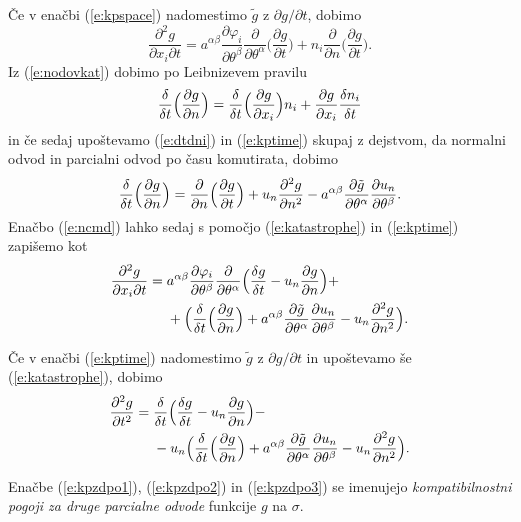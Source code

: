 Če v enačbi (\ref{e:kpspace}) nadomestimo $\tilde{g}$ z $\partial g/\partial t$, dobimo
\begin{equation} \label{e:ncmd}
	\frac{\partial^2 g}{\partial x_i\partial t}=
	a^{\alpha\beta}\frac{\partial\varphi_i}{\partial\theta^{\beta}}
	\frac{\partial}{\partial\theta^{\alpha}}\Big(\frac{\partial g}{\partial t}\Big)+
	n_i\frac{\partial}{\partial n}\Big(\frac{\partial g}{\partial t}\Big).
\end{equation}
Iz (\ref{e:nodovkat}) dobimo po Leibnizevem pravilu
\[
	\frac{\delta}{\delta t}\Big(\frac{\partial g}{\partial n}\Big)=
	\frac{\delta}{\delta t}\Big(\frac{\partial g}{\partial x_i}\Big)n_i+
	\frac{\partial g}{\partial x_i}\frac{\delta n_i}{\delta t}
\]
in če sedaj upoštevamo (\ref{e:dtdni}) in (\ref{e:kptime}) skupaj z dejstvom, da normalni odvod
in parcialni odvod po času komutirata, dobimo
\begin{equation} \label{e:katastrophe}
	\frac{\delta}{\delta t}\Big(\frac{\partial g}{\partial n}\Big)=
	\frac{\partial}{\partial n}\Big(\frac{\partial g}{\partial t}\Big)+
	u_n\frac{\partial^2 g}{\partial n^2}-
	a^{\alpha\beta}\frac{\partial\tilde{g}}{\partial\theta^{\alpha}}\frac{\partial u_n}{\partial\theta^{\beta}}.
\end{equation}
Enačbo (\ref{e:ncmd}) lahko sedaj s pomočjo (\ref{e:katastrophe}) in (\ref{e:kptime})
zapišemo kot
\begin{align}
	\frac{\partial^2 g}{\partial x_i\partial t}=\;&
	a^{\alpha\beta}\frac{\partial\varphi_i}{\partial\theta^{\beta}}
	\frac{\partial}{\partial\theta^{\alpha}}
	\Big(\frac{\delta g}{\delta t}-u_n\frac{\partial g}{\partial n}\Big)+ \nonumber \\
	&+\Big(\frac{\delta}{\delta t}\Big(\frac{\partial g}{\partial n}\Big)+
	a^{\alpha\beta}\frac{\partial\tilde{g}}{\partial\theta^{\alpha}}
	\frac{\partial u_n}{\partial\theta^{\beta}}-u_n\frac{\partial^2 g}{\partial n^2}\Big).
	\label{e:kpzdpo2}
\end{align}

Če v enačbi (\ref{e:kptime}) nadomestimo $\tilde{g}$ z $\partial g/\partial t$
in upoštevamo še (\ref{e:katastrophe}), dobimo
\begin{align}
	\frac{\partial^2 g}{\partial t^2}=\;&
	\frac{\delta}{\delta t}\Big(\frac{\delta g}{\delta t}-u_n\frac{\partial g}{\partial n}\Big)- \nonumber \\
	&-u_n\Big(\frac{\delta}{\delta t}\Big(\frac{\partial g}{\partial n}\Big)+
	a^{\alpha\beta}\frac{\partial\tilde{g}}{\partial\theta^{\alpha}}
	\frac{\partial u_n}{\partial\theta^{\beta}}-u_n\frac{\partial^2 g}{\partial n^2}\Big).
	\label{e:kpzdpo3}
\end{align}

Enačbe (\ref{e:kpzdpo1}), (\ref{e:kpzdpo2}) in (\ref{e:kpzdpo3}) se imenujejo
\emph{kompatibilnostni pogoji za druge parcialne odvode} funkcije $g$ na $\sigma$.